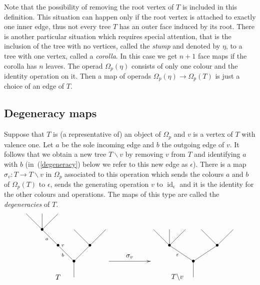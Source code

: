 \documentclass[a4paper]{amsart}
\theoremstyle{plain}
\theoremstyle{definition}
\theoremstyle{remark}
\DeclareMathOperator{\id}{id}
\newcommand{\rpd}{\Omega_p}
\newcommand{\To}{\longrightarrow}
\numberwithin{equation}{section}
\numberwithin{figure}{section}
\begin{document}
Note that the possibility of removing the root vertex of $T$ is
included in this definition. This situation can happen only if the root vertex is attached to exactly one inner edge, thus
not every tree $T$ has an outer face induced by its root. There is another particular situation which requires special
attention, that is the inclusion of the tree with no vertices, called  the \emph{stump} and denoted by $\eta$, to a tree with one vertex,
called a \emph{corolla}. In this case we get $n+1$ face maps if the corolla has $n$ leaves. The operad $\Omega_p(\eta)$ consists of
only one colour and the identity operation on it. Then a map of operads $\Omega_p(\eta)\To \Omega_p(T)$ is just a choice of an
edge of $T$.

\subsection{Degeneracy maps}
Suppose that $T$ is (a representative of) an object of $\rpd$ and
$v$ is a vertex of $T$ with valence one. Let $a$ be the sole
incoming edge and $b$ the outgoing edge of $v$. It follows that we
obtain a new tree $T\backslash v$ by removing $v$ from $T$ and
identifying $a$ with $b$ (in~(\ref{degeneracy}) below we refer
to this new edge as $\epsilon$). There is a map $\sigma_v:T \To
T\backslash v$ in $\rpd$ associated to this operation which sends
the colours $a$ and $b$ of $\Omega_p(T)$ to $\epsilon$, sends the
generating operation $v$ to $\id_\epsilon$ and it is the identity
for the other colours and operations. The maps of this type are called the \emph{degeneracies} of $T$.
\begin{equation}
\xy<0.08cm,0cm>:
(0,20)*{}="1";
(10,20)*=0{}="2";
(20,20)*=0{}="3";
(10,10)*=0{\bullet}="4";
(20,0)*=0{\bullet}="5";
(30,-10)*=0{\bullet}="6";
(40,0)*=0{\bullet}="7";
(30,10)*=0{}="8";
(50,10)*=0{}="9";
(30,-20)*=0{}="10";
(80,10)*=0{}="11";
(90,10)*=0{}="12";
(100,10)*=0{}="13";
(90,0)*=0{\bullet}="14";
(105,-10)*=0{\bullet}="15";
(120,0)*=0{\bullet}="16";
(110,10)*=0{}="17";
(130,10)*=0{}="18";
(105,-20)*=0{}="19";
(13,4)*{\scriptstyle a};
(23,-6)*{\scriptstyle b};
(23,0)*{\scriptstyle v};
(95,-6)*{\scriptstyle \varepsilon};
(65,-7)*{\sigma_v};
"1";"4" **\dir{-};
"2";"4" **\dir{-};
"3";"4" **\dir{-};
"4";"5" **\dir{-};
"5";"6" **\dir{-};
"6";"7" **\dir{-};
"6";"10" **\dir{-};
"7";"8" **\dir{-};
"7";"9" **\dir{-};
"11";"14" **\dir{-};
"12";"14" **\dir{-};
"13";"14" **\dir{-};
"14";"15" **\dir{-};
"15";"16" **\dir{-};
"16";"17" **\dir{-};
"16";"18" **\dir{-};
"15";"19" **\dir{-};
{\ar(52, -10)*{};(78,-10)*{}};
(20,-20)*{T};
(95,-20)*{T\backslash v};
\endxy
\label{degeneracy}
\end{equation}
\end{document}
